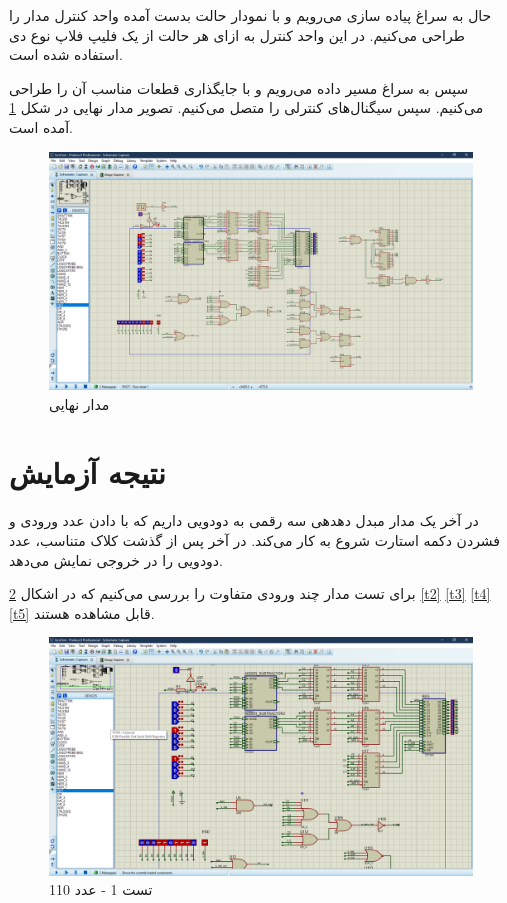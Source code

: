 \documentclass[fleqn]{article}
\begin{document}
حال به سراغ پیاده سازی می‌رویم و با نمودار حالت بدست آمده واحد کنترل مدار را 
طراحی می‌کنیم. در این واحد کنترل به ازای هر حالت از یک فلیپ فلاپ نوع دی استفاده 
شده است.

سپس به سراغ مسیر داده می‌رویم و با جایگذاری قطعات مناسب آن را طراحی می‌کنیم. سپس 
سیگنال‌های کنترلی را متصل می‌کنیم. تصویر مدار نهایی در شکل 
\ref{circ}
آمده است.

\begin{figure}[!htbp]
    \includegraphics[width=\textwidth]{Assets/circuit.png}
    \caption{مدار نهایی}
    \label{circ}
\end{figure}

\section{نتیجه آزمایش}
در آخر یک مدار مبدل دهدهی سه رقمی به دودویی داریم که با دادن عدد ورودی و فشردن 
دکمه استارت شروع به کار می‌کند. در آخر پس از گذشت کلاک متناسب، عدد دودویی را در خروجی نمایش 
می‌دهد. 

برای تست مدار چند ورودی متفاوت را بررسی می‌کنیم که در اشکال 
\ref{t1}
\ref{t2}
\ref{t3}
\ref{t4}
\ref{t5}
قابل مشاهده هستند.

\begin{figure}[!htbp]
    \includegraphics[width=\textwidth]{Assets/t1.png}
    \caption{تست 1 - عدد 110}
    \label{t1}
\end{figure}
\end{document}
